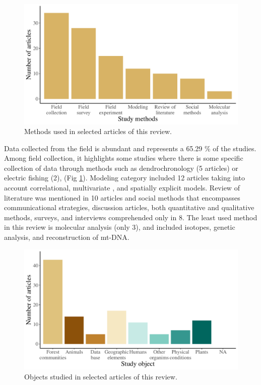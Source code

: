\documentclass[]{article}
\begin{document}
\begin{figure}
\centering
\includegraphics{Review_and_climate_files/figure-latex/Methods-1.pdf}
\caption{\label{fig:Methods}Methods used in selected articles of this review.}
\end{figure}

Data collected from the field is abundant and represents a 65.29 \% of the studies. Among field collection, it highlights some studies where there is some specific collection of data through methods such as dendrochronology (5 articles) or electric fishing (2), (Fig \ref{fig:Methods}).
Modeling category included 12 articles taking into account correlational, multivariate , and spatially explicit models.
Review of literature was mentioned in 10 articles and social methods that encompasses communicational strategies, discussion articles, both quantitative and qualitative methods, surveys, and interviews comprehended only in 8.
The least used method in this review is molecular analysis (only 3), and included isotopes, genetic analysis, and reconstruction of mt-DNA.

\begin{figure}
\centering
\includegraphics{Review_and_climate_files/figure-latex/Objects-1.pdf}
\caption{\label{fig:Objects}Objects studied in selected articles of this review.}
\end{figure}
\end{document}
